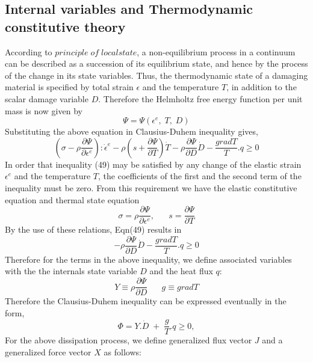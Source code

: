 \subsection{Internal variables and Thermodynamic constitutive theory}
\indent\indent\indent  According to $principle\; of \;local state$, a non-equilibrium process in a continuum can be described as a succession of its equilibrium state, and hence by the process of the change in its state variables. Thus, the thermodynamic state of a damaging material is specified by total strain $\epsilon$ and the temperature $T$, in addition to the scalar damage variable $D$. Therefore the Helmholtz free energy function per unit mass is now given by
\begin{equation}
\Psi  = \Psi(\epsilon^{e},\; T,\; D)
\end{equation}
Substituting the above equation in Clausius-Duhem inequality gives,
\begin{equation}
(\sigma  -  \rho\frac{\partial\Psi}{\partial\epsilon^{e}}):\dot{\epsilon}^{e} - \rho(s +\frac{\partial\Psi}{\partial T})\dot{T}  - \rho\frac{\partial\Psi}{\partial D}\dot{D}  - \frac{gradT}{T}.q  \geq 0 
\end{equation}
In order that inequality (49) may be satisfied by any change of the elastic strain $\epsilon^{e}$ and the temperature $T$, the coefficients of the first and the second term of the inequality must be zero. From this requirement we have the elastic constitutive equation and thermal state equation
\begin{equation}
\sigma  = \rho\frac{\partial\Psi}{\partial\epsilon^{e}}, \;\;\;\;\;\;  s = \frac{\partial\Psi}{\partial T} 
\end{equation}
By the use of these relations, Eqn(49) results in
\begin{equation}
- \rho\frac{\partial\Psi}{\partial D}\dot{D}  - \frac{gradT}{T}.q  \geq 0 
\end{equation}
Therefore for the terms in the above inequality, we define associated variables with the the internals state variable $D$ and the heat flux $q$:
\begin{equation}
Y \equiv \rho\frac{\partial\Psi}{\partial D}  \;\;\;\;\;\; g \equiv gradT 
\end{equation}
Therefore the Clausius-Duhem inequality can be expressed eventually in the form,
\begin{equation}
\Phi  =  Y.\dot{D}  \;  + \; \frac{g}{T} .q  \geq 0,
\end{equation}
For the above dissipation process, we define generalized flux vector $J$ and a generalized force vector $X$ as follows:
